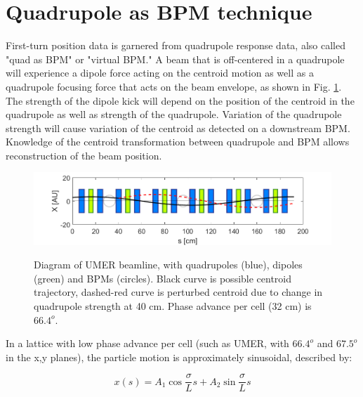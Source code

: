  

\section{Quadrupole as BPM technique} \label{sec:steering:quas-as-bpm}

First-turn position data is garnered from quadrupole response data, also called "quad as BPM" or "virtual BPM." A beam that is off-centered in a quadrupole will experience a dipole force acting on the centroid motion as well as a quadrupole focusing force that acts on the beam envelope, as shown in Fig. \ref{fig:simple-beamline}. The strength of the dipole kick will depend on the position of the centroid in the quadrupole as well as strength of the quadrupole. Variation of the quadrupole strength will cause variation of the centroid as detected on a downstream BPM. Knowledge of the centroid transformation between quadrupole and BPM allows reconstruction of the beam position. 


\begin{figure}
\begin{center}
\includegraphics[width=\textwidth]{4.figures/simple_beamline.png}
\end{center}
\renewcommand{\baselinestretch}{1}
\small\normalsize
\begin{quote}
\caption[]{Diagram of UMER beamline, with quadrupoles (blue), dipoles (green) and BPMs (circles). Black curve is possible centroid trajectory, dashed-red curve is perturbed centroid due to change in quadrupole strength at 40 cm. Phase advance per cell (32 cm) is $66.4^o$.}
\label{fig:simple-beamline}
\end{quote}
\end{figure} 
\renewcommand{\baselinestretch}{2}
\small\normalsize




In a lattice with low phase advance per cell (such as UMER, with $66.4 ^o$ and $67.5 ^o$ in the x,y planes), the particle motion is approximately sinusoidal, described by: 

\begin{equation} x(s) = A_1\cos{\frac{\sigma}{L}s} + A_2\sin{\frac{\sigma}{L}s}\end{equation}

